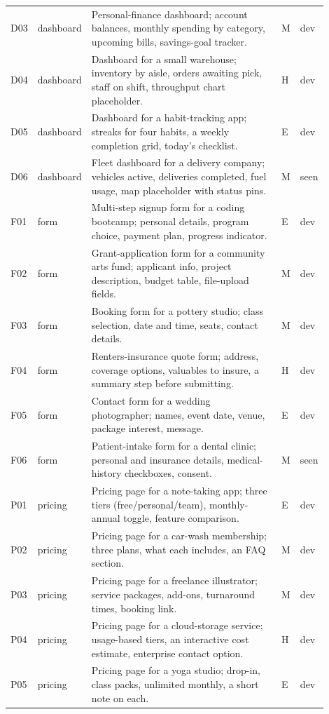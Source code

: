 \begin{small}
\begin{longtable}{@{}p{0.045\linewidth}p{0.075\linewidth}p{0.70\linewidth}p{0.02\linewidth}p{0.055\linewidth}@{}}
D03 & dashboard & Personal-finance dashboard; account balances, monthly spending by category, upcoming bills, savings-goal tracker. & M & dev \\
D04 & dashboard & Dashboard for a small warehouse; inventory by aisle, orders awaiting pick, staff on shift, throughput chart placeholder. & H & dev \\
D05 & dashboard & Dashboard for a habit-tracking app; streaks for four habits, a weekly completion grid, today's checklist. & E & dev \\
D06 & dashboard & Fleet dashboard for a delivery company; vehicles active, deliveries completed, fuel usage, map placeholder with status pins. & M & seen \\
F01 & form & Multi-step signup form for a coding bootcamp; personal details, program choice, payment plan, progress indicator. & E & dev \\
F02 & form & Grant-application form for a community arts fund; applicant info, project description, budget table, file-upload fields. & M & dev \\
F03 & form & Booking form for a pottery studio; class selection, date and time, seats, contact details. & M & dev \\
F04 & form & Renters-insurance quote form; address, coverage options, valuables to insure, a summary step before submitting. & H & dev \\
F05 & form & Contact form for a wedding photographer; names, event date, venue, package interest, message. & E & dev \\
F06 & form & Patient-intake form for a dental clinic; personal and insurance details, medical-history checkboxes, consent. & M & seen \\
P01 & pricing & Pricing page for a note-taking app; three tiers (free/personal/team), monthly-annual toggle, feature comparison. & E & dev \\
P02 & pricing & Pricing page for a car-wash membership; three plans, what each includes, an FAQ section. & M & dev \\
P03 & pricing & Pricing page for a freelance illustrator; service packages, add-ons, turnaround times, booking link. & M & dev \\
P04 & pricing & Pricing page for a cloud-storage service; usage-based tiers, an interactive cost estimate, enterprise contact option. & H & dev \\
P05 & pricing & Pricing page for a yoga studio; drop-in, class packs, unlimited monthly, a short note on each. & E & dev \\

\end{longtable}
\end{small}
